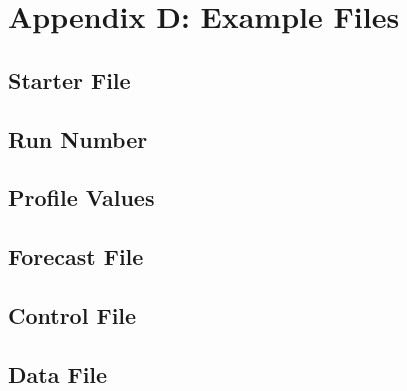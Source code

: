 \section{Appendix D: Example Files}

\subsection{Starter File}

\subsection{Run Number}

\subsection{Profile Values}

\subsection{Forecast File}

\subsection{Control File}

\subsection{Data File}